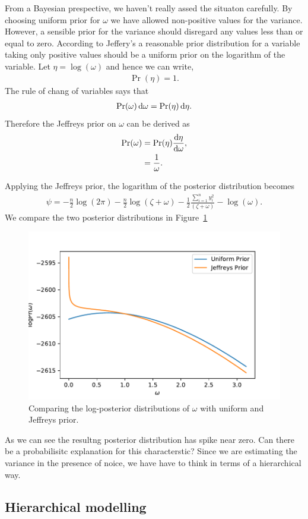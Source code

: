 \documentclass[11pt,twoside,a4paper]{article}
\begin{document}
  From a Bayesian prespective, we haven't really assed the situaton carefully.
  By choosing uniform prior for $\omega$ we have allowed non-positive values
  for the variance. However, a sensible prior for the variance should disregard
  any values less than or equal to zero. According to Jeffery's a reasonable
  prior distribution for a variable taking only positive values should be
  a uniform prior on the logarithm of the variable. Let $\eta = \log(\omega)$
  and hence we can write,
  \begin{align}
    \Pr(\eta) = 1.
  \end{align}
  The rule of chang of variables says that
  \begin{align}
    \Pr(\omega) \dif \omega = \Pr(\eta) \dif \eta.
  \end{align}
  Therefore the Jeffreys prior on $\omega$ can be derived as
  \begin{align}
    \Pr(\omega) &= \Pr(\eta) \frac {\dif \eta}{\dif \omega}, \\
    &= \frac{1}{\omega}.
  \end{align}

  Applying the Jeffreys prior, the logarithm of the posterior distribution
  becomes
  \begin{align}
    \psi  = - \frac{n}{2} \log (2 \pi) - \frac{n}{2} \log (\zeta + \omega)
      - \frac{1}{2} \frac{\sum_{i=1}^n y_i^2}{(\zeta + \omega)} - \log(\omega).
  \end{align}
  We compare the two posterior distributions in
  Figure~\ref{fig_log_post_uniform_jeffreys}
  \begin{figure}
    \includegraphics[scale=0.8]{images/log_post_uniform_jeffreys.pdf}
    \caption{Comparing the log-posterior distributions of $\omega$ with uniform and Jeffreys prior.}
    \label{fig_log_post_uniform_jeffreys}
  \end{figure}
  As we can see the resultng posterior distribution has spike near zero. Can
  there be a probabilisitc explanation for this characterstic? Since we are
  estimating the variance in the presence of noice, we have have to think in
  terms of a hierarchical way.

\subsection{Hierarchical modelling}
\end{document}
